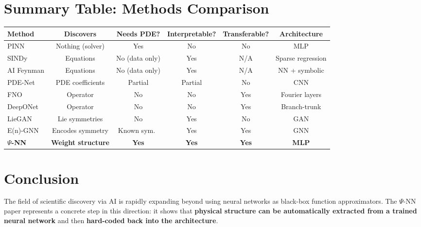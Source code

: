 \documentclass[11pt,a4paper]{article}
\begin{document}
\section{Summary Table: Methods Comparison}

\begin{center}
\small
\renewcommand{\arraystretch}{1.25}
\begin{tabular}{@{}l c c c c c@{}}
\toprule
\textbf{Method} & \textbf{Discovers} & \textbf{Needs PDE?} & \textbf{Interpretable?} & \textbf{Transferable?} & \textbf{Architecture} \\
\midrule
PINN & Nothing (solver) & Yes & No & No & MLP \\
SINDy & Equations & No (data only) & Yes & N/A & Sparse regression \\
AI Feynman & Equations & No (data only) & Yes & N/A & NN + symbolic \\
PDE-Net & PDE coefficients & Partial & Partial & No & CNN \\
FNO & Operator & No & No & Yes & Fourier layers \\
DeepONet & Operator & No & No & Yes & Branch-trunk \\
LieGAN & Lie symmetries & No & Yes & No & GAN \\
E(n)-GNN & Encodes symmetry & Known sym.\ & Yes & Yes & GNN \\
\textbf{$\Psi$-NN} & \textbf{Weight structure} & \textbf{Yes} & \textbf{Yes} & \textbf{Yes} & \textbf{MLP} \\
\bottomrule
\end{tabular}
\end{center}

\section{Conclusion}

The field of scientific discovery via AI is rapidly expanding beyond using neural networks as black-box function approximators. The $\Psi$-NN paper represents a concrete step in this direction: it shows that \textbf{physical structure can be automatically extracted from a trained neural network} and then \textbf{hard-coded back into the architecture}.
\end{document}
